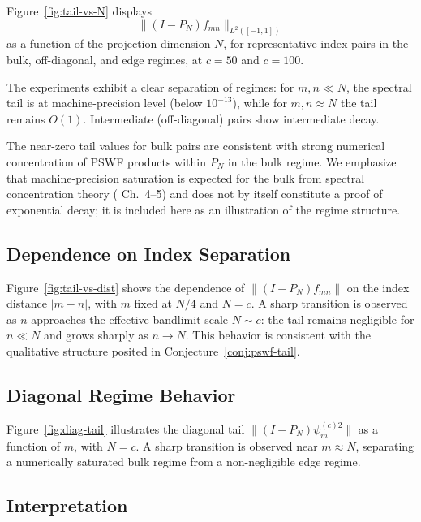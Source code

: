 Figure~\ref{fig:tail-vs-N} displays
\[
  \|(I-P_N)f_{mn}\|_{L^2([-1,1])}
\]
as a function of the projection dimension $N$,
for representative index pairs in the bulk,
off-diagonal, and edge regimes,
at $c = 50$ and $c = 100$.

The experiments exhibit a clear separation of regimes:
for $m, n \ll N$, the spectral tail is at machine-precision level
(below $10^{-13}$),
while for $m, n \approx N$ the tail remains $O(1)$.
Intermediate (off-diagonal) pairs show intermediate decay.

\begin{remark}
The near-zero tail values for bulk pairs
are consistent with strong numerical concentration
of PSWF products within $P_N$
in the bulk regime.
We emphasize that machine-precision saturation
is expected for the bulk from spectral concentration
theory (\cite{Osipov2013} Ch.~4--5)
and does not by itself constitute a proof of exponential decay;
it is included here as an illustration
of the regime structure.
\end{remark}

\subsection{Dependence on Index Separation}
\label{sec:numerics-dist}

Figure~\ref{fig:tail-vs-dist}
shows the dependence of
$\|(I-P_N)f_{mn}\|$ on the index distance $|m-n|$,
with $m$ fixed at $N/4$ and $N = c$.
A sharp transition is observed
as $n$ approaches the effective bandlimit scale $N \sim c$:
the tail remains negligible for $n \ll N$
and grows sharply as $n \to N$.
This behavior is consistent with
the qualitative structure posited in Conjecture~\ref{conj:pswf-tail}.

\subsection{Diagonal Regime Behavior}
\label{sec:numerics-diag}

Figure~\ref{fig:diag-tail}
illustrates the diagonal tail
$\|(I-P_N)\psi_m^{(c)2}\|$
as a function of $m$, with $N = c$.
A sharp transition is observed near $m \approx N$,
separating a numerically saturated bulk regime
from a non-negligible edge regime.

\subsection{Interpretation}
\label{sec:numerics-interp}

